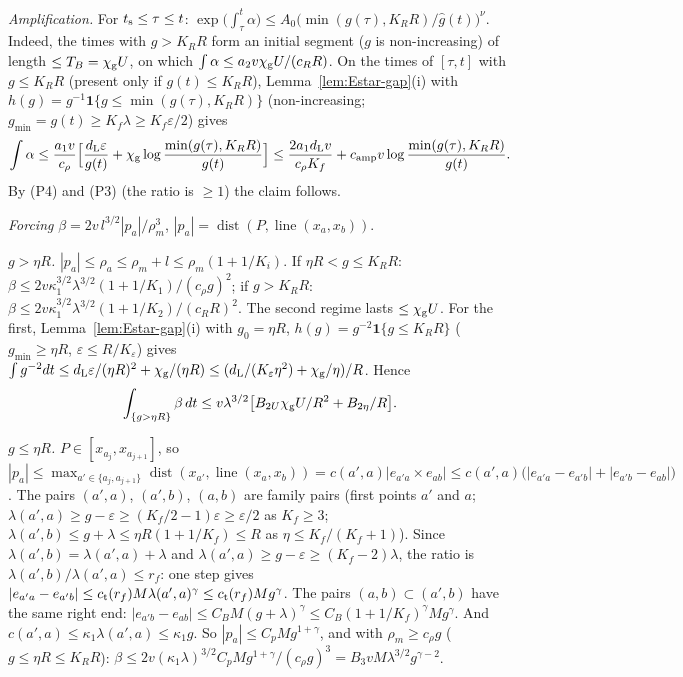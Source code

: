 \emph{Amplification.} For $t_{\mathrm s}\le\tau\le t$: $\exp\bigl(\int_\tau^t\alpha\bigr)\le A_0\bigl(\min(g(\tau),K_RR)/\hat g(t)\bigr)^\nu$.
Indeed, the times with $g>K_RR$ form an initial segment ($g$ is non-increasing) of length $\le T_B=\chi_{\mathrm g} U$, on which
$\int\alpha\le a_2v\chi_{\mathrm g} U/(c_RR)$. On the times of $[\tau,t]$ with $g\le K_RR$ (present only if $g(t)\le K_RR$),
Lemma~\ref{lem:Estar-gap}(i) with $h(g)=g^{-1}\mathbf 1\{g\le\min(g(\tau),K_RR)\}$ (non-increasing; $g_{\min}=g(t)\ge K_f\lambda\ge
K_f\varepsilon/2$) gives
\[
\int\alpha\le\frac{a_1v}{c_\rho}\Bigl[\frac{d_{\mathrm L}\varepsilon}{g(t)}+\chi_{\mathrm g}\log\frac{\min(g(\tau),K_RR)}{g(t)}\Bigr]
\le\frac{2a_1d_{\mathrm L} v}{c_\rho K_f}+c_{\mathrm{amp}} v\log\frac{\min(g(\tau),K_RR)}{g(t)} .
\]
By \textup{(P4)} and \textup{(P3)} (the ratio is $\ge1$) the claim follows.

\emph{Forcing} $\beta=2v\,l^{3/2}|p_a|/\rho_m^3$, $|p_a|=\operatorname{dist}(P,\operatorname{line}(x_a,x_b))$.

\emph{$g>\eta R$.} $|p_a|\le\rho_a\le\rho_m+l\le\rho_m(1+1/K_i)$. If $\eta R<g\le K_RR$:
$\beta\le2v\kappa_1^{3/2}\lambda^{3/2}(1+1/K_1)/(c_\rho g)^2$; if $g>K_RR$: $\beta\le2v\kappa_1^{3/2}\lambda^{3/2}(1+1/K_2)/(c_RR)^2$.
The second regime lasts $\le\chi_{\mathrm g} U$. For the first, Lemma~\ref{lem:Estar-gap}(i) with $g_0=\eta R$,
$h(g)=g^{-2}\mathbf 1\{g\le K_RR\}$ ($g_{\min}\ge\eta R$, $\varepsilon\le R/K_\varepsilon$) gives
$\int g^{-2}dt\le d_{\mathrm L}\varepsilon/(\eta R)^2+\chi_{\mathrm g}/(\eta R)\le(d_{\mathrm L}/(K_\varepsilon\eta^2)+\chi_{\mathrm g}/\eta)/R$. Hence
\[
\int_{\{g>\eta R\}}\beta\,dt\le v\lambda^{3/2}\bigl[B_{2U}\chi_{\mathrm g} U/R^2+B_{2\eta}/R\bigr].
\]

\emph{$g\le\eta R$.} $P\in[x_{a_j},x_{a_{j+1}}]$, so
$|p_a|\le\max_{a'\in\{a_j,a_{j+1}\}}\operatorname{dist}(x_{a'},\operatorname{line}(x_a,x_b))=c(a',a)|e_{a'a}\times e_{ab}|
\le c(a',a)\bigl(|e_{a'a}-e_{a'b}|+|e_{a'b}-e_{ab}|\bigr)$. The pairs $(a',a)$, $(a',b)$, $(a,b)$ are family pairs (first points
$a'$ and $a$; $\lambda(a',a)\ge g-\varepsilon\ge(K_f/2-1)\varepsilon\ge\varepsilon/2$ as $K_f\ge3$;
$\lambda(a',b)\le g+\lambda\le\eta R(1+1/K_f)\le R$ as $\eta\le K_f/(K_f+1)$). Since $\lambda(a',b)=\lambda(a',a)+\lambda$ and
$\lambda(a',a)\ge g-\varepsilon\ge(K_f-2)\lambda$, the ratio is $\lambda(a',b)/\lambda(a',a)\le r_f$: one step gives
$|e_{a'a}-e_{a'b}|\le c_{\mathrm t}(r_f)M\lambda(a',a)^\gamma\le c_{\mathrm t}(r_f)Mg^\gamma$. The pairs $(a,b)\subset(a',b)$ have the same right end:
$|e_{a'b}-e_{ab}|\le C_BM(g+\lambda)^\gamma\le C_B(1+1/K_f)^\gamma Mg^\gamma$. And $c(a',a)\le\kappa_1\lambda(a',a)\le\kappa_1g$. So
$|p_a|\le C_pMg^{1+\gamma}$, and with $\rho_m\ge c_\rho g$ ($g\le\eta R\le K_RR$):
$\beta\le2v(\kappa_1\lambda)^{3/2}C_pMg^{1+\gamma}/(c_\rho g)^3=B_3vM\lambda^{3/2}g^{\gamma-2}$.

